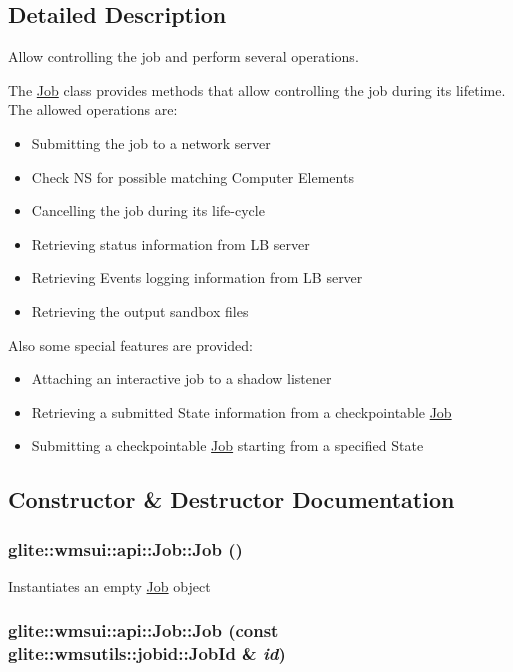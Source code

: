 \subsection{Detailed Description}
Allow controlling the job and perform several operations. 

The \hyperlink{classglite_1_1wmsui_1_1api_1_1Job}{Job} class provides methods that allow controlling the job during its lifetime. The allowed operations are: \begin{itemize}
\item Submitting the job to a network server \item Check NS for possible matching Computer Elements \item Cancelling the job during its life-cycle \item Retrieving status information from LB server \item Retrieving Events logging information from LB server \item Retrieving the output sandbox files \end{itemize}
Also some special features are provided: \begin{itemize}
\item Attaching an interactive job to a shadow listener \item Retrieving a submitted State information from a checkpointable \hyperlink{classglite_1_1wmsui_1_1api_1_1Job}{Job} \item Submitting a checkpointable \hyperlink{classglite_1_1wmsui_1_1api_1_1Job}{Job} starting from a specified State \end{itemize}




\subsection{Constructor \& Destructor Documentation}
\hypertarget{classglite_1_1wmsui_1_1api_1_1Job_z15_0}{
\subsubsection[Job]{\setlength{\rightskip}{0pt plus 5cm}glite::wmsui::api::Job::Job ()}}
\label{classglite_1_1wmsui_1_1api_1_1Job_z15_0}


Instantiates an empty \hyperlink{classglite_1_1wmsui_1_1api_1_1Job}{Job} object \hypertarget{classglite_1_1wmsui_1_1api_1_1Job_z15_1}{
\subsubsection[Job]{\setlength{\rightskip}{0pt plus 5cm}glite::wmsui::api::Job::Job (const glite::wmsutils::jobid::Job\-Id \& {\em id})}}
\label{classglite_1_1wmsui_1_1api_1_1Job_z15_1}


